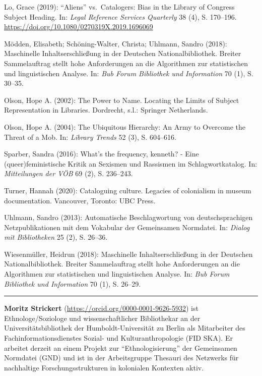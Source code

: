 \documentclass[a4paper,
fontsize=11pt,
oneside,
numbers=noperiodatend,
parskip=half-,
bibliography=totoc,
final
]{scrartcl}
\begin{document}
Lo, Grace (2019): \enquote{Aliens} vs.~Catalogers: Bias in the Library
of Congress Subject Heading. In: \emph{Legal Reference Services
Quarterly} 38 (4), S. 170--196.
\url{https://doi.org/10.1080/0270319X.2019.1696069}

Mödden, Elisabeth; Schöning-Walter, Christa; Uhlmann, Sandro (2018):
Maschinelle Inhaltserschließung in der Deutschen Nationalbibliothek.
Breiter Sammelauftrag stellt hohe Anforderungen an die Algorithmen zur
statistischen und linguistischen Analyse. In: \emph{Bub Forum Bibliothek
und Information} 70 (1), S. 30--35.

Olson, Hope A. (2002): The Power to Name. Locating the Limits of Subject
Representation in Libraries. Dordrecht, s.l.: Springer Netherlands.

Olson, Hope A. (2004): The Ubiquitous Hierarchy: An Army to Overcome the
Threat of a Mob. In: \emph{Library Trends} 52 (3), S. 604--616.

Sparber, Sandra (2016): What's the frequency, kenneth? - Eine
(queer)feministische Kritik an Sexismen und Rassismen im
Schlagwortkatalog. In: \emph{Mitteilungen der VÖB} 69 (2), S. 236--243.

Turner, Hannah (2020): Cataloguing culture. Legacies of colonialism in
museum documentation. Vancouver, Toronto: UBC Press.

Uhlmann, Sandro (2013): Automatische Beschlagwortung von
deutschsprachigen Netzpublikationen mit dem Vokabular der Gemeinsamen
Normdatei. In: \emph{Dialog mit Bibliotheken} 25 (2), S. 26--36.

Wiesenmüller, Heidrun (2018): Maschinelle Inhaltserschließung in der
Deutschen Nationalbibliothek. Breiter Sammelauftrag stellt hohe
Anforderungen an die Algorithmen zur statistischen und linguistischen
Analyse. In: \emph{Bub Forum Bibliothek und Information} 70 (1), S.
26--29.

\begin{center}\rule{0.5\linewidth}{0.5pt}\end{center}

\textbf{Moritz Strickert} (\url{https://orcid.org/0000-0001-9626-5932})
ist Ethnologe/Soziologe und wissenschaftlicher Bibliothekar an der
Universitätsbibliothek der Humboldt-Universität zu Berlin als
Mitarbeiter des Fachinformationsdienstes Sozial- und Kulturanthropologie
(FID SKA). Er arbeitet derzeit an einem Projekt zur ``Ethnologisierung''
der Gemeinsamen Normdatei (GND) und ist in der Arbeitsgruppe Thesauri
des Netzwerks für nachhaltige Forschungsstrukturen in kolonialen
Kontexten aktiv.
\end{document}
